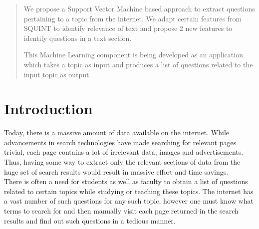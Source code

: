 \documentclass[10pt,a4paper]{report}
\begin{document}

\vspace{2in}

\begin{abstract} 
We propose a Support Vector Machine based approach to extract questions pertaining to a topic from the internet.
We adapt certain features from SQUINT\cite{squint} to identify relevance of text and propose 2 new features to identify questions in a text section.

This Machine Learning component is being developed as an application which takes a topic as input and produces a list of questions related to the input topic as output.
\end{abstract}


\tableofcontents

\newpage
{} %


\chapter{Introduction}

Today, there is a massive amount of data available on the internet. While advancements in search technologies have made searching for relevant pages trivial, each page contains a lot of irrelevant data, images and advertisements. Thus, having some way to extract only the relevant sections of data from the huge set of search results would result in massive effort and time savings. \\

There is often a need for students as well as faculty to obtain a list of questions related to certain topics while studying or teaching these topics. The internet has a vast number of such questions for any such topic, however one must know what terms to search for and then manually visit each page returned in the search results and find out such questions in a tedious manner. \\
\end{document}
